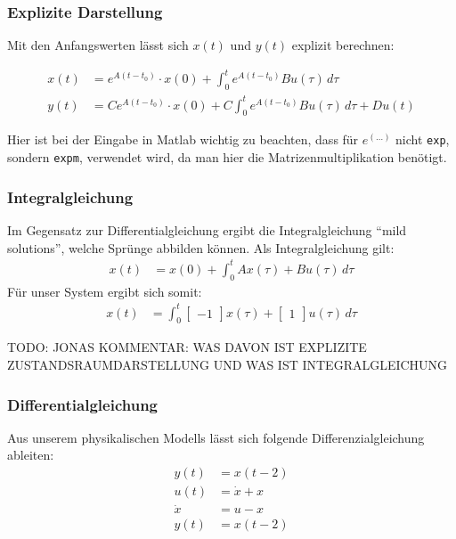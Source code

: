 \subsubsection{Explizite Darstellung}

Mit den Anfangswerten lässt sich $x(t)$ und $y(t)$ explizit berechnen:

\begin{align*}
    x(t) & = e^{A(t-t_0)} \cdot x(0) + \int_{0}^{t} e^{A(t-t_0)}Bu(\tau) \,d\tau \nonumber \\
    y(t) & = Ce^{A(t-t_0)} \cdot x(0) + C \int_{0}^{t} e^{A(t-t_0)}Bu(\tau) \,d\tau + Du(t)
\end{align*}

Hier ist bei der Eingabe in Matlab wichtig zu beachten, dass für $e^{(\ldots)}$ nicht \texttt{exp}, sondern \texttt{expm}, verwendet wird, da man hier die Matrizenmultiplikation benötigt.


\subsubsection{Integralgleichung}
Im Gegensatz zur Differentialgleichung ergibt die Integralgleichung \enquote{mild solutions}, welche Sprünge abbilden können.
Als Integralgleichung gilt:
\begin{align*}
    x(t) & = x(0) + \int_{0}^{t} Ax(\tau) + Bu(\tau)\,d\tau
\end{align*}
Für unser System ergibt sich somit:
\begin{align*}
    x(t) & = \int_{0}^{t} \begin{bmatrix}
        -1
    \end{bmatrix}x(\tau) + \begin{bmatrix}
        1
    \end{bmatrix}u(\tau)\,d\tau
\end{align*}

TODO: JONAS KOMMENTAR: WAS DAVON IST EXPLIZITE ZUSTANDSRAUMDARSTELLUNG UND WAS IST INTEGRALGLEICHUNG

\subsubsection{Differentialgleichung}
Aus unserem physikalischen Modells lässt sich folgende Differenzialgleichung ableiten:
\begin{align*}
    y(t) & = x(t - 2) \\
    u(t) & = \dot x + x \\
    \dot x & = u - x\\
    y(t) & = x(t - 2) \\
\end{align*}

